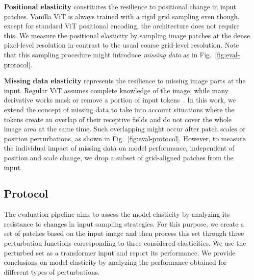 \documentclass[10pt,twocolumn,letterpaper]{article}
\begin{document}
\textbf{Positional elasticity} constitutes the resilience to positional change in input patches. Vanilla ViT is always trained with a rigid grid sampling even though, except for standard ViT positional encoding, the architecture does not require this.
We measure the positional elasticity by sampling image patches at the dense pixel-level resolution in contrast to the usual coarse grid-level resolution. Note that this sampling procedure might introduce \textit{missing data} as in Fig.~\ref{fig:eval-protocol}.

\textbf{Missing data elasticity} represents the resilience to missing image parts at the input.
Regular ViT assumes complete knowledge of the image, while many derivative works mask or remove a portion of input tokens~\cite{he2022masked,rao2021dynamicvit}.
In this work, we extend the concept of missing data to take into account situations where the tokens create an overlap of their receptive fields and do not cover the whole image area at the same time. Such overlapping might occur after patch scales or position perturbations, as shown in Fig.~\ref{fig:eval-protocol}. However, to measure the individual impact of missing data on model performance, independent of position and scale change, we drop a subset of grid-aligned patches from the input.



\subsection{Protocol}


The evaluation pipeline aims to assess the model elasticity by analyzing its resistance to changes in input sampling strategies. For this purpose, we create a set of patches based on the input image and then process this set through three perturbation functions corresponding to three considered elasticities. We use the perturbed set as a transformer input and report its performance. We provide conclusions on model elasticity by analyzing the performance obtained for different types of perturbations.
\end{document}
